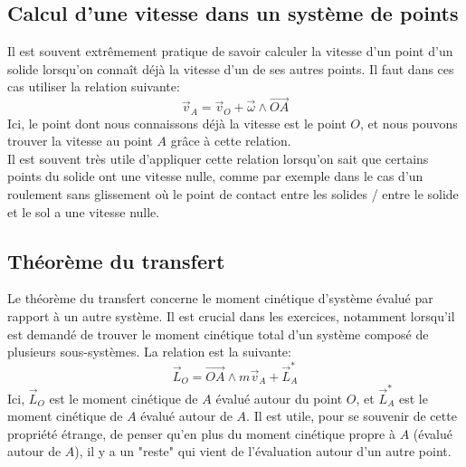 \documentclass{article}
\numberwithin{equation}{section}
\begin{document}
\subsection{Calcul d'une vitesse dans un système de points}
Il est souvent extrêmement pratique de savoir calculer la vitesse d'un point d'un solide lorsqu'on connaît déjà la vitesse d'un de ses autres points. Il faut dans ces cas utiliser la relation suivante:
\begin{equation}
	\boxed{ \vec v_A = \vec v_O + \vec \omega \wedge \overrightarrow{OA} }
\end{equation}
Ici, le point dont nous connaissons déjà la vitesse est le point \(O\), et nous pouvons trouver la vitesse au point \(A\) grâce à cette relation. \\
Il est souvent très utile d'appliquer cette relation lorsqu'on sait que certains points du solide ont une vitesse nulle, comme par exemple dans le cas d'un roulement sans glissement où le point de contact entre les solides / entre le solide et le sol a une vitesse nulle.

\subsection{Théorème du transfert}
Le théorème du transfert concerne le moment cinétique d'système évalué par rapport à un autre système. Il est crucial dans les exercices, notamment lorsqu'il est demandé de trouver le moment cinétique total d'un système composé de plusieurs sous-systèmes. La relation est la suivante:
\begin{equation}
	\vec L_O = \overrightarrow{OA} \wedge m \vec v_A + \vec L_A^*
\end{equation}
Ici, \(\vec L_O\) est le moment cinétique de \(A\) évalué autour du point \(O\), et \(\vec L_A^*\) est le moment cinétique de \(A\) évalué autour de \(A\). Il est utile, pour se souvenir de cette propriété étrange, de penser qu'en plus du moment cinétique propre à \(A\) (évalué autour de \(A\)), il y a un "reste" qui vient de l'évaluation autour d'un autre point.
\end{document}
